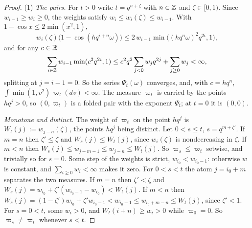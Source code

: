 \begin{proof}
\leanok
{}
(1) \emph{The pairs.} For $t > 0$ write $t = q^{n+\zeta}$ with $n \in \mathbb{Z}$ and $\zeta \in [0,1)$.
Since $w_{i-1} \ge w_i \ge 0$, the weights satisfy $w_i \le w_i(\zeta) \le w_{i-1}$. With
$1 - \cos x \le 2\min(x^2, 1)$,
\[
  w_i(\zeta)\bigl(1 - \cos(hq^{i+n}\omega)\bigr) \le 2\,w_{i-1}\min\bigl((hq^n\omega)^2q^{2i}, 1\bigr),
\]
and for any $c \in \mathbb{R}$
\[
  \sum_{i \in \mathbb{Z}}w_{i-1}\min(c^2q^{2i}, 1) \le c^2q^2\sum_{j < 0}w_jq^{2j} + \sum_{j \ge 0}w_j
  < \infty ,
\]
splitting at $j = i - 1 = 0$. So the series $\Psi_t(\omega)$ converges, and, with $c = hq^n$,
$\int\min(1, v^2)\,\varpi_t(dv) < \infty$. The measure $\varpi_t$ is carried by the points
$hq^j > 0$, so $(0, \varpi_t)$ is a folded pair with the exponent $\Psi_t$; at $t = 0$ it is
$(0, 0)$.

\emph{Monotone and distinct.} The weight of $\varpi_t$ on the point $hq^j$ is
$W_t(j) := w_{j-n}(\zeta)$, the points $hq^j$ being distinct. Let $0 < s \le t$, $s = q^{m+\zeta'}$.
If $m = n$ then $\zeta' \le \zeta$ and $W_s(j) \le W_t(j)$, since $w_i(\zeta)$ is nondecreasing in
$\zeta$. If $m < n$ then $W_s(j) \le w_{j-m-1} \le w_{j-n} \le W_t(j)$. So
$\varpi_s \le \varpi_t$ setwise, and trivially so for $s = 0$. Some step of the weights is strict,
$w_{i_0} < w_{i_0-1}$: otherwise $w$ is constant, and $\sum_{i \ge 0}w_i < \infty$ makes it zero.
For $0 < s < t$ the atom $j = i_0 + m$ separates the two measures. If $m = n$ then $\zeta' < \zeta$
and $W_s(j) = w_{i_0} + \zeta'(w_{i_0-1} - w_{i_0}) < W_t(j)$. If $m < n$ then
$W_s(j) = (1-\zeta')w_{i_0} + \zeta'w_{i_0-1} < w_{i_0-1} \le w_{i_0+m-n} \le W_t(j)$, since
$\zeta' < 1$. For $s = 0 < t$, some $w_i > 0$, and $W_t(i + n) \ge w_i > 0$ while $\varpi_0 = 0$.
So $\varpi_s \ne \varpi_t$ whenever $s < t$.


\end{proof}
